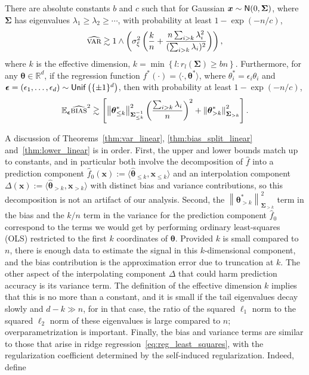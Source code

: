 \begin{theorem}\label{thm:lower_linear}
    There are absolute constants $b$ and $c$ such that for Gaussian ${\boldsymbol x}\sim{\sf N}(0,{\boldsymbol \Sigma})$, where ${\boldsymbol \Sigma}$ has eigenvalues $\lambda_1\ge\lambda_2\ge\cdots$,
    with probability at least $1-\exp(-n/c)$,
	\begin{align*}
		{\widehat{\textsc{var}}} \gtrsim 1\wedge\left(
		\sigma^2_\xi \left( \frac{k}{n}
		+ \frac{ n \sum_{i>k} \lambda_i^2}{(\sum_{i>k}
		\lambda_i)^2}\right)\right),
	\end{align*}
    where $k$ is the effective dimension, $ k = \min\left\{l: r_l({\boldsymbol \Sigma})\ge bn\right\}$.
    Furthermore, for any ${\boldsymbol \theta}\in{\mathbb R}^d$, if the regression function
    $f^*(\cdot)=\langle\cdot,{\boldsymbol \theta}^*\rangle$, where
    $\theta^*_i=\epsilon_i\theta_i$ and
    $\boldsymbol{\epsilon}=(\epsilon_1,\ldots,\epsilon_d)\sim{\sf Unif}\left(\{\pm 1\}^d\right)$,
    then with probability at least $1-\exp(-n/c)$,
	\begin{align*}
		{\mathbb E}_{\boldsymbol{\epsilon}}{\widehat{\textsc{bias}}^2} \gtrsim
		\left[\left\|{\boldsymbol \theta}^*_{\leq k}\right\|_{{\boldsymbol \Sigma}_{\leq k}^{-1}}^2
		\left( \frac{\sum_{i>k} \lambda_i}{n}\right)^2 +
		\left\|{\boldsymbol \theta}^*_{>k}\right\|^2_{{\boldsymbol \Sigma}_{>k}}\right].
	\end{align*}
\end{theorem}

A discussion of Theorems~\ref{thm:var_linear},
\ref{thm:bias_split_linear} and~\ref{thm:lower_linear} is in order. First, the upper and lower bounds match up to constants, and in particular both involve the decomposition  of $\widehat f$ into a prediction component $\widehat
f_0({\boldsymbol x}):=\langle\widehat{\boldsymbol \theta}_{\leq k},{\boldsymbol x}_{\leq k}\rangle$
and an interpolation component
$\Delta({\boldsymbol x}):=\langle\widehat{\boldsymbol \theta}_{> k},{\boldsymbol x}_{>
k}\rangle$ with distinct bias and variance contributions, so this decomposition is not an artifact of our analysis.  Second, the
$\left\|{\boldsymbol \theta}^*_{>k}\right\|^2_{{\boldsymbol \Sigma}_{>k}}$ term in the bias and the $k/n$ term in the variance for the prediction component
$\widehat f_0$ correspond to the terms we would get by performing ordinary least-squares (OLS) restricted to the first $k$ coordinates of
${\boldsymbol \theta}$. Provided $k$ is small compared to $n$, there is enough data to estimate the signal in this $k$-dimensional component, and the bias contribution is the approximation error due to truncation at $k$.  The other aspect of the interpolating component
$\Delta$ that could harm prediction accuracy is its variance term. The definition of the effective dimension $k$ implies that this is no more than a constant, and it is small if the tail eigenvalues decay slowly and
$d-k\gg n$, for in that case, the ratio of the squared $\ell_1$
norm to the squared $\ell_2$ norm of these eigenvalues is large compared to $n$; overparametrization is important. Finally, the bias and variance terms are similar to those that arise in ridge regression~\eqref{eq:reg_least_squares},
with the regularization coefficient determined by the self-induced regularization. Indeed, define


